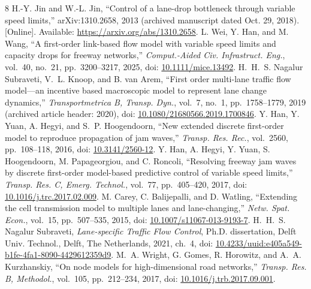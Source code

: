 \documentclass[10pt,a4paper]{article}
\newcommand{\Jin}[1]{\textcolor{SrcJin}{#1}}
\newcommand{\Wei}[1]{\textcolor{SrcWei}{#1}}
\newcommand{\NS}[1]{\textcolor{SrcNS}{#1}}
\newcommand{\Hsix}[1]{\textcolor{SrcHan16}{#1}}
\newcommand{\Hseven}[1]{\textcolor{SrcHan17}{#1}}
\newcommand{\Carey}[1]{\textcolor{SrcCarey}{#1}}
\newcommand{\Thesis}[1]{\textcolor{SrcThesis}{#1}}
\newcommand{\Wright}[1]{\textcolor{SrcWright}{#1}}
\newcommand{\head}[1]{\par\vspace{5pt}\noindent\textbf{#1}\par\nobreak\vspace{1pt}}
\begin{document}
\par\pdfsavepos
{}
\makeatletter
\renewcommand{\section}{\@ifstar{\head}{\head}}
\renewcommand{\@biblabel}[1]{\ifcase#1\or\Jin{[#1]}\or\Wei{[#1]}\or\NS{[#1]}\or\Hsix{[#1]}\or\Hseven{[#1]}\or\Carey{[#1]}\or\Thesis{[#1]}\or\Wright{[#1]}\else[#1]\fi}
\makeatother
\begin{thebibliography}{8}
\setlength{\itemsep}{4pt}\setlength{\parskip}{0pt}
 \Jin{H.-Y. Jin and W.-L. Jin, ``Control of a lane-drop bottleneck
through variable speed limits,'' arXiv:1310.2658, 2013 (archived manuscript
dated Oct. 29, 2018). [Online]. Available:
\url{https://arxiv.org/abs/1310.2658}.}
 \Wei{L. Wei, Y. Han, and M. Wang, ``A first-order link-based flow
model with variable speed limits and capacity drops for freeway networks,''
\emph{Comput.-Aided Civ. Infrastruct. Eng.}, vol.~40, no.~21,
pp.~3200--3217, 2025, doi:
\href{https://doi.org/10.1111/mice.13492}{10.1111/mice.13492}.}
 \NS{H.~H.~S. Nagalur Subraveti, V.~L. Knoop, and B. van Arem,
``First order multi-lane traffic flow model---an incentive based macroscopic
model to represent lane change dynamics,'' \emph{Transportmetrica B, Transp.
Dyn.}, vol.~7, no.~1, pp.~1758--1779, 2019 (archived article header: 2020),
doi: \href{https://doi.org/10.1080/21680566.2019.1700846}{10.1080/21680566.2019.1700846}.}
 \Hsix{Y. Han, Y. Yuan, A. Hegyi, and S.~P. Hoogendoorn,
``New extended discrete first-order model to reproduce propagation of jam
waves,'' \emph{Transp. Res. Rec.}, vol.~2560, pp.~108--118, 2016, doi:
\href{https://doi.org/10.3141/2560-12}{10.3141/2560-12}.}
 \Hseven{Y. Han, A. Hegyi, Y. Yuan, S. Hoogendoorn,
M. Papageorgiou, and C. Roncoli, ``Resolving freeway jam waves by discrete
first-order model-based predictive control of variable speed limits,''
\emph{Transp. Res. C, Emerg. Technol.}, vol.~77, pp.~405--420, 2017, doi:
\href{https://doi.org/10.1016/j.trc.2017.02.009}{10.1016/j.trc.2017.02.009}.}
 \Carey{M. Carey, C. Balijepalli, and D. Watling, ``Extending the
cell transmission model to multiple lanes and lane-changing,''
\emph{Netw. Spat. Econ.}, vol.~15, pp.~507--535, 2015, doi:
\href{https://doi.org/10.1007/s11067-013-9193-7}{10.1007/s11067-013-9193-7}.}
 \Thesis{H.~H.~S. Nagalur Subraveti, \emph{Lane-specific Traffic
Flow Control}, Ph.D. dissertation, Delft Univ. Technol., Delft, The
Netherlands, 2021, ch.~4, doi:
\href{https://doi.org/10.4233/uuid:e405a549-b1fe-4fa1-8090-4429612359d9}{10.4233/uuid:e405a549-b1fe-4fa1-8090-4429612359d9}.}
 \Wright{M.~A. Wright, G. Gomes, R. Horowitz, and
A.~A. Kurzhanskiy, ``On node models for high-dimensional road networks,''
\emph{Transp. Res. B, Methodol.}, vol.~105, pp.~212--234, 2017, doi:
\href{https://doi.org/10.1016/j.trb.2017.09.001}{10.1016/j.trb.2017.09.001}.}
\end{thebibliography}
\end{document}
